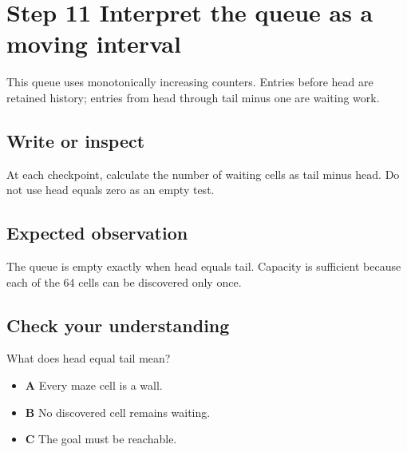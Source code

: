 \section{Step 11 Interpret the queue as a moving interval}\label{maze-s11}

This queue uses monotonically increasing counters. Entries before head are retained history; entries from head through tail minus one are waiting work.

\subsection{Write or inspect}

At each checkpoint, calculate the number of waiting cells as tail minus head. Do not use head equals zero as an empty test.

\subsection{Expected observation}

The queue is empty exactly when head equals tail. Capacity is sufficient because each of the 64 cells can be discovered only once.

\subsection{Check your understanding}

What does head equal tail mean?

\begin{itemize}
  \item \textbf{A} Every maze cell is a wall.
  \item \textbf{B} No discovered cell remains waiting.
  \item \textbf{C} The goal must be reachable.
\end{itemize}
